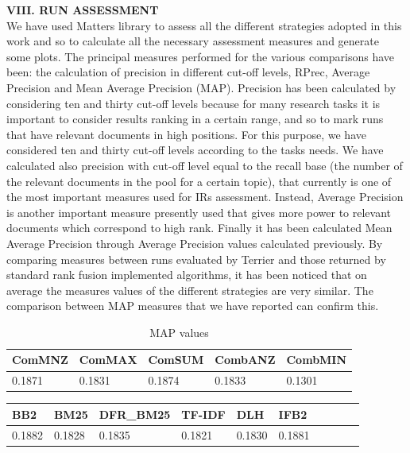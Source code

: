 \documentclass[12pt,journal]{IEEEtran}
\begin{document}
\textbf{VIII.	RUN ASSESSMENT} \\
We have used Matters library to assess all the different strategies adopted in this work and so to calculate all the necessary assessment measures and generate some plots.
The principal measures performed for the various comparisons have been: the calculation of precision in different cut-off levels, RPrec, Average Precision and Mean Average Precision (MAP).
Precision has been calculated by considering ten and thirty cut-off levels because for many research tasks it is important to consider results ranking in a certain range, and so to mark runs that have relevant documents in high positions. For this purpose, we have considered ten and thirty cut-off levels according to the tasks needs. We have calculated also precision with cut-off level equal to the recall base (the number of the relevant documents in the pool for a certain topic), that currently is one of the most important measures used for IRs assessment.
Instead, Average Precision is another important measure presently used that gives more power to relevant documents which correspond to high rank.
Finally it has been calculated Mean Average Precision through Average Precision values calculated previously.
By comparing measures between runs evaluated by Terrier and those returned by standard rank fusion implemented algorithms, it has been noticed that on average the measures values of the different strategies are very similar. The comparison between MAP measures that we have reported can confirm this.

\begin{table}[h!]
\centering
\caption{MAP values}
\begin{tabular}{|l|l|l|l|l|}
\hline
ComMNZ & ComMAX & ComSUM & CombANZ & CombMIN \\ \hline
0.1871 & 0.1831 & 0.1874 & 0.1833 & 0.1301 \\ \hline
\end{tabular}
\end{table}

\begin{table}[h!]
\centering
\begin{tabular}{|l|l|l|l|l|l|l|l|l|l|}
\hline
BB2    & BM25   & DFR\_BM25 & TF-IDF & DLH & IFB2     \\ \hline
0.1882 & 0.1828 & 0.1835    & 0.1821 & 0.1830 & 0.1881 \\ \hline

\end{tabular}
\end{table}
\end{document}
